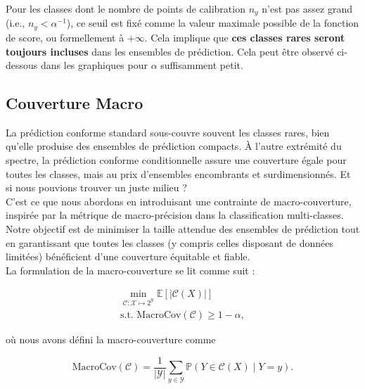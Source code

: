 \documentclass[12pt,a4paper]{article}
\begin{document}
\noindent Pour les classes dont le nombre de points de calibration $n_y$ n'est pas assez grand (i.e., $n_y < \alpha^{-1}$), ce seuil est fixé comme la valeur maximale possible de la fonction de score, ou formellement à $+\infty$. Cela implique que \textbf{ces classes rares seront toujours incluses} dans les ensembles de prédiction. Cela peut être observé ci-dessous dans les graphiques pour $\alpha$ suffisamment petit.





\subsection{Couverture Macro}

\noindent La prédiction conforme standard sous-couvre souvent les classes rares, bien qu'elle produise des ensembles de prédiction compacts. À l'autre extrémité du spectre, la prédiction conforme conditionnelle assure une couverture égale pour toutes les classes, mais au prix d'ensembles encombrants et surdimensionnés. Et si nous pouvions trouver un juste milieu ?\\

\noindent C'est ce que nous abordons en introduisant une contrainte de macro-couverture, inspirée par la métrique de macro-précision dans la classification multi-classes. Notre objectif est de minimiser la taille attendue des ensembles de prédiction tout en garantissant que toutes les classes (y compris celles disposant de données limitées) bénéficient d'une couverture équitable et fiable.\\

\noindent La formulation de la macro-couverture se lit comme suit :

\begin{equation}
\begin{aligned}
\min_{\mathcal{C}: \mathcal{X} \mapsto 2^{\mathcal{Y}}} \mathbb{E}[|\mathcal{C}(X)|] \\
\text{s.t. MacroCov}(\mathcal{C}) \geq 1 - \alpha,
\end{aligned}
\end{equation}

\noindent où nous avons défini la macro-couverture comme

\begin{equation}
\text{MacroCov}(\mathcal{C}) = \frac{1}{|\mathcal{Y}|} \sum_{y \in \mathcal{Y}} \mathbb{P}(Y \in \mathcal{C}(X) \mid Y = y).
\end{equation}
\end{document}
